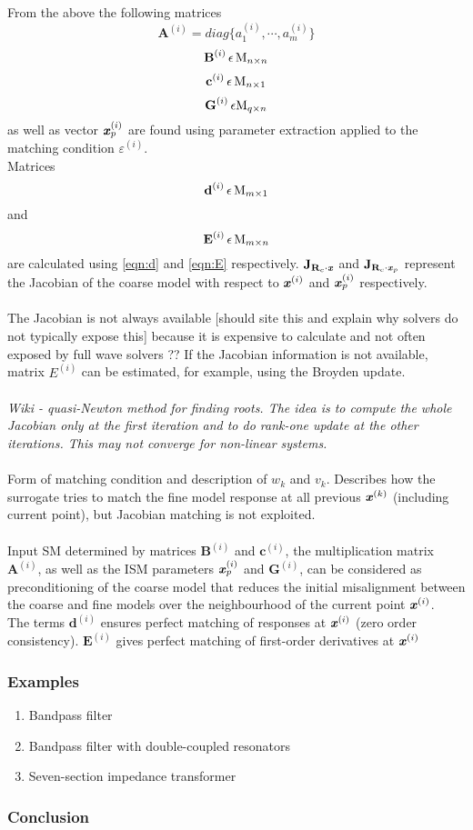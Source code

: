 From the above the following matrices 
$$
\textbf{A}^{(i)} = diag\{ a^{(i)}_1, \cdots , a ^{(i)}_m \}
$$
$$
\textbf{B}^{(i)} \, \epsilon \, \textup{M}_{n \times n}
$$
$$
\textbf{c}^{(i)} \, \epsilon \, \textup{M}_{n \times 1}
$$
$$
\textbf{G}^{(i)} \, \epsilon \textup{M}_{q \times n}
$$
as well as vector $\textbf{\textit{x}}^{(i)}_p$ are found using parameter extraction applied to the matching condition $\varepsilon ^{(i)}$. \\
Matrices 
$$
\textbf{d}^{(i)} \, \epsilon \, \textup{M}_{m \times 1}
$$
and 
$$
\textbf{E}^{(i)} \, \epsilon \, \textup{M}_{m \times n}
$$
are calculated using \ref{eqn:d} and \ref{eqn:E} respectively. $\textbf{J}_{\textbf{R}_c \cdot \textbf{\textit{x}}}$ and $\textbf{J}_{\textbf{R}_c \cdot \textbf{\textit{x}}_p}$ 
represent the Jacobian of the coarse model with respect to $\textbf{\textit{x}}^{(i)}$ and $\textbf{\textit{x}}^{(i)}_p$ respectively. 
\\ \\
The Jacobian is not always available [should site this and explain why solvers do not typically expose this] because it is expensive to calculate and not often exposed by full wave solvers ??
If the Jacobian information is not available, matrix $E^{(i)}$ can be estimated, for example, using the Broyden update. 
\\ \\
\textit{Wiki - quasi-Newton method for finding roots. The idea is to compute the whole Jacobian only at the first iteration and to do rank-one update at the other iterations. This may not converge for non-linear systems.}
\\ \\
Form of matching condition and description of $w_k$ and $v_k$. Describes how the surrogate tries to match the fine model response at all previous $\textbf{\textit{x}}^{(k)}$ (including current point), but Jacobian matching is not exploited.
\\ \\
Input SM determined by matrices $ \textbf{B}^{(i)} $ and $ \textbf{c}^{(i)} $, the multiplication matrix $ \textbf{A}^{(i)} $, as well as the ISM parameters $ \textbf{\textit{x}}^{(i)}_p $ and  $ \textbf{G}^{(i)} $, can be considered as preconditioning of the coarse model that reduces the initial misalignment between the coarse and fine models over the neighbourhood of the current point $ \textbf{\textit{x}}^{(i)} $. 
\\
The terms $ \textbf{d}^{(i)} $ ensures perfect matching of responses at $ \textbf{\textit{x}}^{(i)} $ (zero order consistency). $ \textbf{E}^{(i)} $ gives perfect matching of first-order derivatives at $ \textbf{\textit{x}}^{(i)} $




\subsubsection*{Examples}
\begin{enumerate}
\item Bandpass filter
\item Bandpass filter with double-coupled resonators
\item Seven-section impedance transformer
\end{enumerate}
\subsubsection*{Conclusion}

